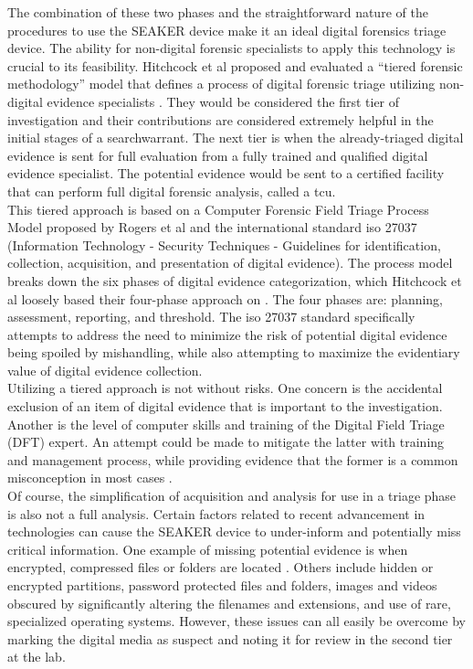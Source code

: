 \documentclass[12pt]{article}
\begin{document}
The combination of these two phases and the straightforward nature of the procedures to use
the SEAKER device make it an ideal digital forensics triage device.  The ability for
non-digital forensic specialists to apply this technology is crucial to its feasibility.
Hitchcock et al proposed and evaluated a ``tiered forensic
methodology'' model that defines a process of digital forensic triage utilizing non-digital
evidence specialists \cite{hitchcock2016tiered}.  They would be considered the first tier of
investigation and their
contributions are considered extremely helpful in the initial stages of a \gls{searchwarrant}.
The next tier is when the already-triaged digital evidence is sent for full evaluation from
a fully trained and qualified digital evidence specialist.
The potential evidence would be sent to a certified facility that can perform full digital
forensic analysis, called a \gls{tcu}.\\

This tiered approach is based on a Computer Forensic Field Triage Process Model proposed
by Rogers et al \cite{rogers2006computer} and the international standard \gls{iso} 27037
(Information Technology - Security Techniques - Guidelines for identification, collection,
acquisition, and presentation of digital evidence). The process model breaks down the six
phases of digital evidence categorization, which Hitchcock et al
loosely based their four-phase approach on \cite{hitchcock2016tiered}.  The four phases are: planning, assessment,
reporting, and threshold.  The \gls{iso} 27037 standard specifically attempts to address the need
to minimize the risk of potential digital evidence being spoiled by mishandling, while also
attempting to maximize the evidentiary value of digital evidence collection.\\

Utilizing a tiered approach is not without risks.  One concern is the accidental exclusion
of an item of digital evidence that is important to the investigation.  Another is the
level of computer skills and training of the Digital Field Triage (DFT) expert.  An attempt
could be made to mitigate the latter with training and management process, while providing
evidence that the former is a common misconception in most cases \cite{rogers2006computer}.\\

Of course, the simplification of acquisition and analysis for use in a triage phase is also
not a full analysis. Certain factors related to recent advancement in technologies can cause
the SEAKER device to under-inform and potentially miss critical information.  One
example of missing potential evidence is when encrypted, compressed files or folders
are located \cite{shaw2013practical}.  Others include hidden or encrypted partitions,
password protected files and folders, images and videos obscured by significantly altering
the filenames and extensions, and use of rare, specialized operating systems. However,
these issues can all easily be overcome by marking the digital media as suspect and noting
it for review in the second tier at the lab.\\
\end{document}
